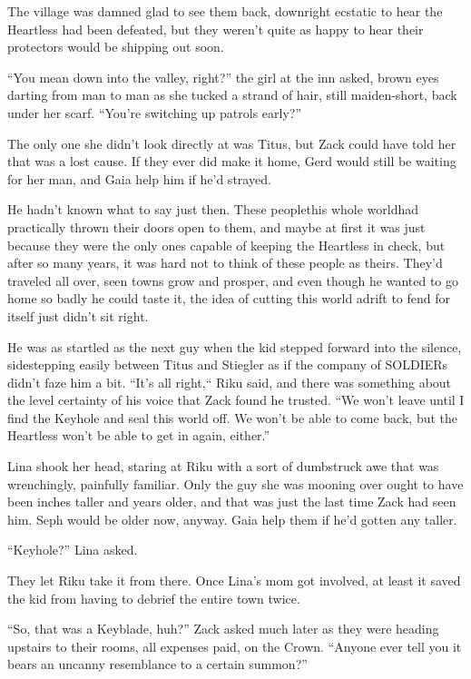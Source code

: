 \renewcommand{\pfbreakdisplay}{%
\ding{66}\quad\ding{66}\quad\ding{66}}

The village was damned glad to see them back, downright ecstatic to hear the Heartless had been defeated, but they weren't quite as happy to hear their protectors would be shipping out soon.

``You mean down into the valley, right?'' the girl at the inn asked, brown eyes darting from man to man as she tucked a strand of hair, still maiden-short, back under her scarf. ``You're switching up patrols early?''

The only one she didn't look directly at was Titus, but Zack could have told her that was a lost cause. If they ever did make it home, Gerd would still be waiting for her man, and Gaia help him if he'd strayed.

He hadn't known what to say just then. These people\textemdash this whole world\textemdash had practically thrown their doors open to them, and maybe at first it was just because they were the only ones capable of keeping the Heartless in check, but after so many years, it was hard not to think of these people as theirs. They'd traveled all over, seen towns grow and prosper, and even though he wanted to go home so badly he could taste it, the idea of cutting this world adrift to fend for itself just didn't sit right.

He was as startled as the next guy when the kid stepped forward into the silence, sidestepping easily between Titus and Stiegler as if the company of SOLDIERs didn't faze him a bit. ``It's all right,`` Riku said, and there was something about the level certainty of his voice that Zack found he trusted. ``We won't leave until I find the Keyhole and seal this world off. We won't be able to come back, but the Heartless won't be able to get in again, either.''

Lina shook her head, staring at Riku with a sort of dumbstruck awe that was wrenchingly, painfully familiar. Only the guy she was mooning over ought to have been inches taller and years older, and that was just the last time Zack had seen him. Seph would be older now, anyway. Gaia help them if he'd gotten any taller.

``Keyhole?'' Lina asked.

They let Riku take it from there. Once Lina's mom got involved, at least it saved the kid from having to debrief the entire town twice.

``So, that was a Keyblade, huh?'' Zack asked much later as they were heading upstairs to their rooms, all expenses paid, on the Crown. ``Anyone ever tell you it bears an uncanny resemblance to a certain summon?''

